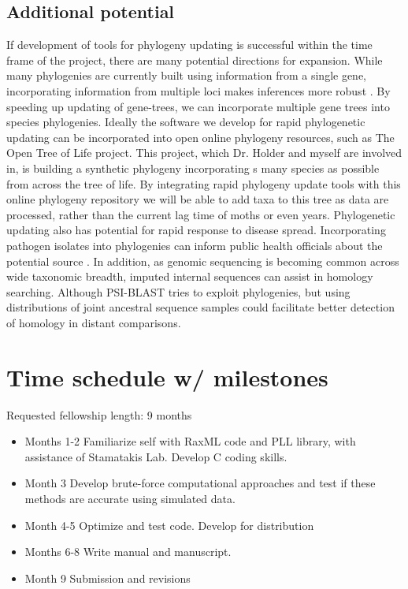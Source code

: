 \documentclass[10pt]{article}
\begin{document}
\subsection*{Additional potential}
If development of tools for phylogeny updating is successful within the time frame of the project, there are many potential directions for expansion. 
While many phylogenies are currently built using information from a single gene, incorporating information from multiple loci makes inferences more robust \cite{edwards_looking_2009}. 
By speeding up updating of gene-trees, we can incorporate multiple gene trees into species phylogenies.
Ideally the software we develop for rapid phylogenetic updating can be incorporated into open online phylogeny resources, such as The Open Tree of Life project. 
This project, which Dr. 
Holder and myself are involved in, is building a synthetic phylogeny incorporating s many species as possible from across the tree of life. 
By integrating rapid phylogeny update tools with this online phylogeny repository we will be able to add taxa to this tree as data are processed, rather than the current lag time of moths or even years. 
Phylogenetic updating also has potential for rapid response to disease spread. 
Incorporating pathogen isolates into phylogenies can inform public health officials about the potential source \cite{timme_phylogenetic_2013}.
In addition, as genomic sequencing is becoming common across wide taxonomic breadth, imputed internal sequences can assist in homology searching.
Although PSI-BLAST \cite{Altschul_gapped_1997} tries to exploit phylogenies, but using distributions of joint ancestral sequence samples could facilitate better detection of homology in distant comparisons.

         
\section*{Time schedule w/ milestones}
   Requested fellowship length: 9 months
 
\begin{itemize}
  \item{Months 1-2} Familiarize self with RaxML code and PLL library, with assistance of Stamatakis Lab. 
Develop C coding skills.
  \item{Month 3} Develop brute-force computational approaches and test if these methods are accurate using simulated data.
  \item{Month 4-5} Optimize and test code. Develop for distribution 
  \item{Months 6-8} Write manual and manuscript.
  \item{Month 9} Submission and revisions
\end{itemize}
\end{document}
